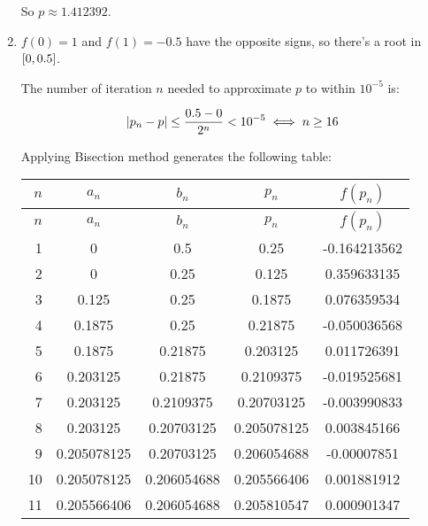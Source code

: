 \documentclass[../../Assignments.tex]{subfiles}
\begin{document}
\begin{solution}
\begin{enumerate}[label = (\alph*)]
            So \(p \approx \num{1.412392}\).

        \item \(f(0) = 1\) and \(f(1) = \num{-0.5}\) have the opposite signs, so
            there's a root in \(\interval{0}{\num{0.5}}\).

            The number of iteration \(n\) needed to approximate \(p\) to within
            \(10^{-5}\) is:

            \[\abs{p_n - p} \leq \frac{\num{0.5} - 0}{2^n} < 10^{-5} \iff n \geq 16\]

            Applying Bisection method generates the following table:

            \begin{longtable}{r S[table-format=1.9] S[table-format=1.9] S[table-format=1.9] S[table-format=-1.9]}
                \toprule
                \(n\)  &   {\(a_n\)}   &   {\(b_n\)}   &   {\(p_n\)}   &  {\(f(p_n)\)}  \\
                \midrule
                \endfirsthead
                \(n\)  &   {\(a_n\)}   &   {\(b_n\)}   &   {\(p_n\)}   &  {\(f(p_n)\)}  \\
                \midrule
                  &  0            &  0.5          &  0.25         &  -0.164213562  \\
                    2  &  0            &  0.25         &  0.125        &   0.359633135  \\
                    3  &  0.125        &  0.25         &  0.1875       &   0.076359534  \\
                    4  &  0.1875       &  0.25         &  0.21875      &  -0.050036568  \\
                    5  &  0.1875       &  0.21875      &  0.203125     &   0.011726391  \\
                    6  &  0.203125     &  0.21875      &  0.2109375    &  -0.019525681  \\
                    7  &  0.203125     &  0.2109375    &  0.20703125   &  -0.003990833  \\
                    8  &  0.203125     &  0.20703125   &  0.205078125  &   0.003845166  \\
                    9  &  0.205078125  &  0.20703125   &  0.206054688  &  -0.00007851   \\
                    10  &  0.205078125  &  0.206054688  &  0.205566406  &   0.001881912  \\
                    11  &  0.205566406  &  0.206054688  &  0.205810547  &   0.000901347  \\

\end{longtable}
\end{enumerate}
\end{solution}
\end{document}

